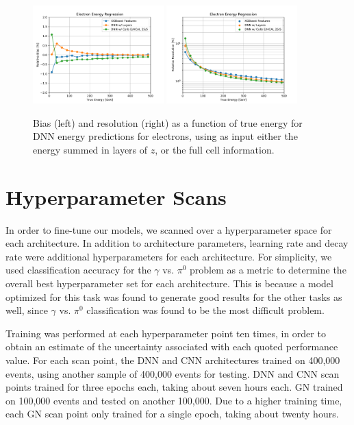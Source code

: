 \begin{figure}[htbp]
\centering
\includegraphics[width=0.45\textwidth]{Images/Calo/bias_vs_E_EleFixed_nn_inputs_zoom.pdf}
\includegraphics[width=0.45\textwidth]{Images/Calo/res_vs_E_EleFixed_nn_inputs_fits.pdf}
\caption{Bias (left) and resolution (right) as a function of true energy for DNN energy predictions for electrons, using as input either the energy summed in layers of $z$, or the full cell information.\label{fig:reg_dnn_inputs}}
\end{figure}

\section{Hyperparameter Scans}\label{sec:hpscan}

In order to fine-tune our models, we scanned over a hyperparameter space for each architecture. In addition to architecture parameters, learning rate and decay rate were additional hyperparameters for each architecture. For simplicity, we used classification accuracy for the $\gamma$ vs. $\pi^0$ problem as a metric to determine the overall best hyperparameter set for each architecture. This is because a model optimized for this task was found to generate good results for the other tasks as well, since $\gamma$ vs. $\pi^0$ classification was found to be the most difficult problem.

Training was performed at each hyperparameter point ten times, in order to obtain an estimate of the uncertainty associated with each quoted performance value. For each scan point, the DNN and CNN architectures trained on 400,000 events, using another sample of 400,000 events for testing. DNN and CNN scan points trained for three epochs each, taking about seven hours each. GN trained on 100,000 events and tested on another 100,000. Due to a higher training time, each GN scan point only trained for a single epoch, taking about twenty hours.

